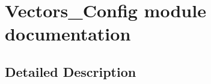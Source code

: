 \hypertarget{group___vectors___config__module}{}\section{Vectors\+\_\+\+Config module documentation}
\label{group___vectors___config__module}


\subsection{Detailed Description}
